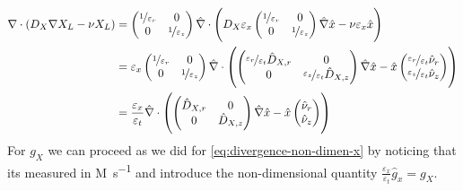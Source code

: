 \documentclass[11pt]{article}
\numberwithin{equation}{section}
\begin{document}
\begin{align}
    \nabla \cdot ( D_X \nabla X_L - \nu X_L  )
    &=
    \begin{pmatrix}
        \nicefrac{1}{\varepsilon_r} & 0 \\
        0 & \nicefrac{1}{\varepsilon_z}
    \end{pmatrix}
    \hat{\nabla}
    \cdot
    \left( 
        D_X
        \varepsilon_x
        \begin{pmatrix}
        \nicefrac{1}{\varepsilon_r} & 0 \\
        0 & \nicefrac{1}{\varepsilon_z}
    \end{pmatrix}
    \hat{\nabla} \hat{x} - \nu \varepsilon_x \hat{x}
    \right)
    \notag
    \\
    &= \varepsilon_x
    \begin{pmatrix}
        \nicefrac{1}{\varepsilon_r} & 0 \\
        0 & \nicefrac{1}{\varepsilon_z}
    \end{pmatrix}
    \hat{\nabla}
    \cdot
    \left( 
        \begin{pmatrix}
         \nicefrac{\varepsilon_r}{\varepsilon_t} \hat{D}_{X,r} & 0 
         \\
        0 &  \nicefrac{\varepsilon_z}{\varepsilon_t} \hat{D}_{X,z}
    \end{pmatrix}
    \hat{\nabla} \hat{x} - \hat{x}
    \begin{pmatrix}
         \nicefrac{\varepsilon_r}{\varepsilon_t} \hat{\nu}_{r} 
         \\
        \nicefrac{\varepsilon_z}{\varepsilon_t} \hat{\nu}_{z}
    \end{pmatrix}
    \right)
    \notag
    \\
    &= \frac{\varepsilon_x}{\varepsilon_t}
    \hat{\nabla}
    \cdot
    \left( 
        \begin{pmatrix}
         \hat{D}_{X,r} & 0 
         \\
        0 &  \hat{D}_{X,z}
    \end{pmatrix}
    \hat{\nabla} \hat{x} - \hat{x}
    \begin{pmatrix}
         \hat{\nu}_{r} 
         \\
        \hat{\nu}_{z}
    \end{pmatrix}
    \right)
    \label{eq:divergence-non-dimen-x}
\end{align}
For \(g_X\) we can proceed as we did for \eqref{eq:divergence-non-dimen-x} by noticing that its measured in \si{M.s^{-1}} and introduce the non-dimensional quantity \( \frac{\varepsilon_x}{\varepsilon_t}\hat{g}_{x} = g_X\).
\end{document}
